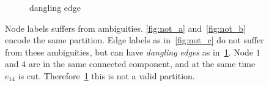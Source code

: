 \begin{center}
\begin{figure}[th]
\begin{tiny}
\begin{subfigure}[t]{0.22\linewidth}
{    }
\caption{ \tiny{dangling edge}}
\label{fig:not_d}
\end{subfigure}
\end{tiny}
\vspace{-0.1cm}
\caption{
Node labels suffers from ambiguities.
\ref{fig:not_a} and~\ref{fig:not_b} encode the same partition.
Edge labels as in~\ref{fig:not_c} do not suffer from these 
ambiguities, but can have \emph{dangling edges} as in~\ref{fig:not_d}.
Node $1$ and $4$
are in the same connected component,
and at the same time $e_{14}$ is cut.
Therefore~\ref{fig:not_d} this is not a valid partition.
}\label{fig:notation}
\end{figure}
\end{center}

